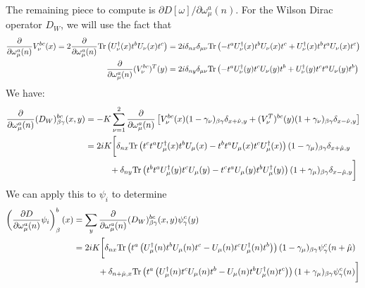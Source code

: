 The remaining piece to compute is $\partial D[\omega] / \partial\omega_\mu^a(n)$. For the Wilson Dirac operator $D_W$, we will use the fact that
\begin{align}\begin{split}
	\frac{\partial}{\partial\omega_\mu^a(n)} V_\nu^{bc}(x) = 2 \frac{\partial}{\partial\omega_\mu^a(n)} \mathrm{Tr} \left( U_\nu^\dagger(x) t^b U_\nu(x) t^c \right) &= 2i \delta_{nx} \delta_{\mu\nu} \mathrm{Tr} \left( - t^a U_\nu^\dagger(x) t^b U_\nu(x) t^c + U_\nu^\dagger(x) t^b t^a U_\nu(x) t^c \right) \\
	\frac{\partial}{\partial\omega_\mu^a(n)} (V_\nu^{bc})^T(y) &= 2i \delta_{ny} \delta_{\mu\nu} \mathrm{Tr} \left( - t^a U_\nu^\dagger(y) t^c U_\nu(y) t^b + U_\nu^\dagger(y) t^c t^a U_\nu(y) t^b \right)
\end{split}\end{align}
We have:
\begin{align}\begin{split}
	\frac{\partial }{\partial\omega_\mu^a(n)} (D_W)_{\beta\gamma}^{bc}(x, y) &= - K \sum_{\nu = 1}^2 \frac{\partial}{\partial\omega_\mu^a(n)} \left[ V_\nu^{bc}(x) (1 - \gamma_\nu)_{\beta\gamma} \delta_{x + \hat\nu, y} + (V_{\nu}^T)^{bc}(y) (1 + \gamma_\nu)_{\beta\gamma} \delta_{x - \hat\nu, y} \right] \\
	&= 2 i K \bigg[ \delta_{nx} \mathrm{Tr}\left( t^c t^a U_\mu^\dagger(x) t^b U_\mu(x) - t^b t^a U_\mu(x) t^c U_\mu^\dagger(x) \right) (1 - \gamma_\mu)_{\beta\gamma} \delta_{x + \hat\mu, y} \\
	&\hspace{1cm}+ \delta_{ny} \mathrm{Tr}\left( t^bt^a U_\mu^\dagger(y) t^c U_\mu(y) - t^c t^a U_\mu(y) t^b U_\mu^\dagger(y) \right) (1 + \gamma_\mu)_{\beta\gamma} \delta_{x - \hat\mu, y} \bigg]
\end{split}\end{align}
We can apply this to $\psi_i$ to determine
\begin{align}\begin{split}
	\left( \frac{\partial D}{\partial\omega_\mu^a(n)} \psi_i \right)_\beta^b(x) &= \sum_y \frac{\partial}{\partial\omega_\mu^a(n)} (D_W)_{\beta\gamma}^{bc}(x, y) \psi_\gamma^c(y) \\
	&= 2 i K \bigg[ \delta_{nx} \mathrm{Tr} \left( t^a \left( U_\mu^\dagger(n) t^b U_\mu(n) t^c - U_\mu(n) t^c U_\mu^\dagger(n) t^b \right) \right) (1 - \gamma_\mu)_{\beta\gamma} \psi_\gamma^c(n + \hat\mu) \\
	&\hspace{1cm}+ \delta_{n + \hat\mu, x} \mathrm{Tr}\left( t^a \left( U_\mu^\dagger(n) t^c U_\mu(n) t^b - U_\mu(n) t^b U_\mu^\dagger(n) t^c \right) \right) (1 + \gamma_\mu)_{\beta\gamma} \psi_\gamma^c(n) \bigg]
	\label{eq:dDdw}
\end{split}\end{align}
